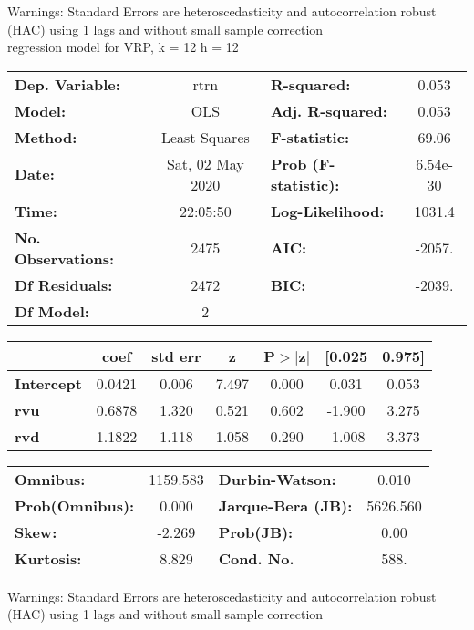 Warnings: \newline
 [1] Standard Errors are heteroscedasticity and autocorrelation robust (HAC) using 1 lags and without small sample correction\\ 

regression model for VRP, k = 12 h = 12\begin{center}
\begin{tabular}{lclc}
\toprule
\textbf{Dep. Variable:}    &       rtrn       & \textbf{  R-squared:         } &     0.053   \\
\textbf{Model:}            &       OLS        & \textbf{  Adj. R-squared:    } &     0.053   \\
\textbf{Method:}           &  Least Squares   & \textbf{  F-statistic:       } &     69.06   \\
\textbf{Date:}             & Sat, 02 May 2020 & \textbf{  Prob (F-statistic):} &  6.54e-30   \\
\textbf{Time:}             &     22:05:50     & \textbf{  Log-Likelihood:    } &    1031.4   \\
\textbf{No. Observations:} &        2475      & \textbf{  AIC:               } &    -2057.   \\
\textbf{Df Residuals:}     &        2472      & \textbf{  BIC:               } &    -2039.   \\
\textbf{Df Model:}         &           2      & \textbf{                     } &             \\
\bottomrule
\end{tabular}
\begin{tabular}{lcccccc}
                   & \textbf{coef} & \textbf{std err} & \textbf{z} & \textbf{P$> |$z$|$} & \textbf{[0.025} & \textbf{0.975]}  \\
\midrule
\textbf{Intercept} &       0.0421  &        0.006     &     7.497  &         0.000        &        0.031    &        0.053     \\
\textbf{rvu}       &       0.6878  &        1.320     &     0.521  &         0.602        &       -1.900    &        3.275     \\
\textbf{rvd}       &       1.1822  &        1.118     &     1.058  &         0.290        &       -1.008    &        3.373     \\
\bottomrule
\end{tabular}
\begin{tabular}{lclc}
\textbf{Omnibus:}       & 1159.583 & \textbf{  Durbin-Watson:     } &    0.010  \\
\textbf{Prob(Omnibus):} &   0.000  & \textbf{  Jarque-Bera (JB):  } & 5626.560  \\
\textbf{Skew:}          &  -2.269  & \textbf{  Prob(JB):          } &     0.00  \\
\textbf{Kurtosis:}      &   8.829  & \textbf{  Cond. No.          } &     588.  \\
\bottomrule
\end{tabular}
\end{center}

Warnings: \newline
 [1] Standard Errors are heteroscedasticity and autocorrelation robust (HAC) using 1 lags and without small sample correction\\ 

